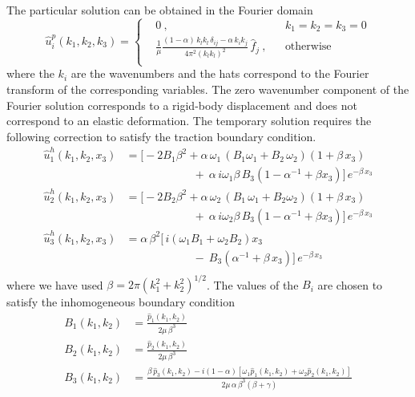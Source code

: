 \documentclass[10pt]{article}
\begin{document}
%
The particular solution can be obtained in the Fourier domain
%
\begin{equation}\label{eqn:full_space_fourier_solution}
\hat{u}^p_i(k_1,k_2,k_3)=\left\{
\begin{aligned}
&0~,  & &k_1=k_2=k_3=0\\
&\frac{1}{\mu}\frac{(1-\alpha)\,k_lk_l\,\delta_{ij}-\alpha\,k_ik_j}{4\pi^2(k_lk_l)^2}\,\hat{f}_j~, & &\text{otherwise}\\
\end{aligned}
\right.
\end{equation}
where the $k_i$ are the wavenumbers and the hats correspond to the Fourier transform of the corresponding variables. The zero wavenumber component of the Fourier solution corresponds to a rigid-body displacement and does not correspond to an elastic deformation. The temporary solution requires the following correction to satisfy the traction boundary condition. 
\begin{equation}\label{eqn:fourier_domain_solution}
\begin{aligned}
\hat{u}_1^h(k_1,k_2,x_3)&=\big[-2B_1\beta^2+\alpha\,\omega_1\,(B_1\omega_1+B_2\,\omega_2)(1+\beta\,x_3)\\
&\qquad\qquad\qquad+~\alpha\,i\omega_1\beta\,B_3(1-\alpha^{-1}+\beta x_3)\big]\,e^{-\beta\,x_3}\\
\hat{u}_2^h(k_1,k_2,x_3)&=\big[-2B_2\beta^2+\alpha\,\omega_2\,(B_1\,\omega_1+B_2\omega_2)(1+\beta\,x_3)\\
&\qquad\qquad\qquad+~\alpha\,i\omega_2\beta\,B_3(1-\alpha^{-1}+\beta x_3)\big]\,e^{-\beta\,x_3}\\
\hat{u}_3^h(k_1,k_2,x_3)&=\alpha\,\beta^2\big[\,i\left(\omega_1B_1+\omega_2B_2\right)x_3\\
&\qquad\qquad\qquad-~B_3\left(\alpha^{-1}+\beta\,x_3\right)\big]\,e^{-\beta\,x_3}\\
\end{aligned}
\end{equation}
where we have used $\beta=2\pi\left(k_1^2+k_2^2\right)^{1/2}$. The values of the $B_i$ are chosen to satisfy the inhomogeneous boundary condition
\begin{equation}
\begin{aligned}
B_1(k_1,k_2)&=\frac{\hat{p}_1(k_1,k_2)}{2\mu\,\beta^3}\\
B_2(k_1,k_2)&=\frac{\hat{p}_2(k_1,k_2)}{2\mu\,\beta^3}\\
B_3(k_1,k_2)&=\frac{\beta\,\hat{p}_3(k_1,k_2)-i(1-\alpha)[\omega_1\hat{p}_1(k_1,k_2)+\omega_2\hat{p}_2(k_1,k_2)]}{2\mu\,\alpha\,\beta^3(\beta+\gamma)}
\end{aligned}
\end{equation}
\end{document}
